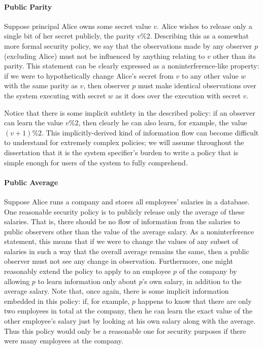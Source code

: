\paragraph{Public Parity}
Suppose principal Alice owns some secret value $v$. Alice wishes to release
only a single bit of her secret publicly, the parity $v\%2$. Describing this
as a somewhat more formal security policy, we say that the observations made by 
any observer $p$ (excluding Alice) must not be influenced by anything relating 
to $v$ other than its parity. This statement can be clearly expressed 
as a noninterference-like property: if we were to hypothetically
change Alice's secret from $v$ to any other value $w$ with the same parity 
as $v$, then observer $p$ must make identical observations over the system 
executing with secret $w$ as it does over the execution with secret $v$.

Notice that
there is some implicit subtlety in the described policy: if an observer can 
learn the value $v\%2$, then clearly he can also learn, for example, the value 
$(v+1)\%2$. This implicitly-derived kind of information flow can become difficult
to understand for extremely complex policies; we will assume throughout the
dissertation that it is the system specifier's burden to write a policy that
is simple enough for users of the system to fully comprehend.

\paragraph{Public Average}
Suppose Alice runs a company and stores all employees' salaries in a database.
One reasonable security policy is to publicly release only the average of these 
salaries. That is, there should be no flow of information from the salaries to 
public observers other than the value of the average salary. As a noninterference statement,
this means that if we were to change the values of any subset of salaries in
such a way that the overall average remains the same, then a public observer
must not see any change in observation. Furthermore, one might reasonably
extend the policy to apply to an employee $p$ of the company by allowing $p$
to learn information only about $p$'s own salary, in addition to the average
salary. Note that, once again, there is some implicit information embedded
in this policy: if, for example, $p$ happens to know that there are only two employees in
total at the company, then he can learn the exact value of the other employee's
salary just by looking at his own salary along with the average. Thus this
policy would only be a reasonable one for security purposes if there were many 
employees at the company.

